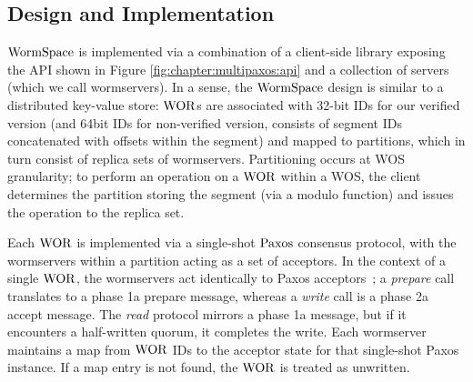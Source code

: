 



\subsection{Design and Implementation}
\label{chapter:wormspace:subsec:design-and-implementation}


$\mathrm{WormSpace}$ is implemented via a combination of a client-side library exposing the API shown in Figure \ref{fig:chapter:multipaxos:api} and a collection of servers (which we call wormservers). In a sense, the $\mathrm{WormSpace}$ design is similar to a distributed key-value store: $\mathrm{WOR}$s are associated with 32-bit IDs for our verified version (and 64bit IDs for non-verified version, consists of segment IDs concatenated with offsets within the segment) and mapped to partitions, which in turn consist of replica sets of wormservers. Partitioning occurs at WOS granularity; to perform an operation on a $\mathrm{WOR}$ within a WOS, the client determines the partition storing the segment (via a modulo function) and issues the operation to the replica set.

Each $\mathrm{WOR}$ is implemented via a single-shot $\mathrm{Paxos}$ consensus protocol, with the wormservers within a partition acting as a set of acceptors. In the context of a single $\mathrm{WOR}$, the wormservers act identically to Paxos acceptors~\cite{paxosmadesimple}; a \textit{prepare} call translates to a phase 1a prepare message, whereas a \textit{write} call is a phase 2a accept message. The \textit{read} protocol mirrors a phase 1a message, but if it encounters a half-written quorum, it completes the write. Each wormserver maintains a map from $\mathrm{WOR}$ IDs to the acceptor state for that single-shot Paxos instance. If a map entry is not found, the $\mathrm{WOR}$ is treated as unwritten.


